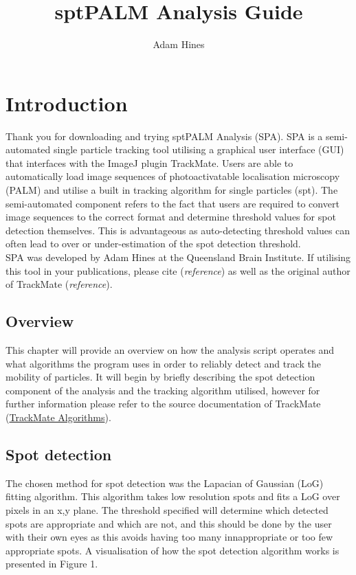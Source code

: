 \documentclass[11pt]{article} %
\title{sptPALM Analysis Guide}
\author{Adam Hines}
\date{}
\begin{document}
\maketitle

\newpage
\tableofcontents

\newpage

\section{Introduction}

Thank you for downloading and trying sptPALM Analysis (SPA). SPA is a semi-automated single particle tracking tool utilising a graphical user interface (GUI) that interfaces with the ImageJ plugin TrackMate. Users are able to automatically load image sequences of photoactivatable localisation microscopy (PALM) and utilise a built in tracking algorithm for single particles (spt). The semi-automated component refers to the fact that users are required to convert image sequences to the correct format and determine threshold values for spot detection themselves. This is advantageous as auto-detecting threshold values can often lead to over or under-estimation of the spot detection threshold. \\
SPA was developed by Adam Hines at the Queensland Brain Institute. If utilising this tool in your publications, please cite (\textit{reference}) as well as the original author of TrackMate (\textit{reference}).

\subsection{Overview}

This chapter will provide an overview on how the analysis script operates and what algorithms the program uses in order to reliably detect and track the mobility of particles. It will begin by briefly describing the spot detection component of the analysis and the tracking algorithm utilised, however for further information please refer to the source documentation of TrackMate (\href{https://imagej.net/TrackMate_Algorithms}{TrackMate Algorithms}).

\subsection{Spot detection}

The chosen method for spot detection was the Lapacian of Gaussian (LoG) fitting algorithm. This algorithm takes low resolution spots and fits a LoG over pixels in an x,y plane. The threshold specified will determine which detected spots are appropriate and which are not, and this should be done by the user with their own eyes as this avoids having too many innappropriate or too few appropriate spots. A visualisation of how the spot detection algorithm works is presented in Figure 1.\\
\end{document}
